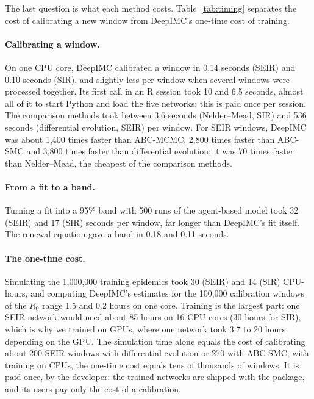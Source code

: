 \documentclass[12pt]{article}
\begin{document}
The last question is what each method costs. Table~\ref{tab:timing} separates the cost of calibrating a
new window from DeepIMC's one-time cost of training.

\paragraph{Calibrating a window.} On one CPU core, DeepIMC calibrated a window in 0.14 seconds (SEIR) and
0.10 seconds (SIR), and slightly less per window when several windows were processed together. Its first
call in an R session took 10 and 6.5 seconds, almost all of it to start Python and load the five
networks; this is paid once per session. The comparison methods took between 3.6 seconds (Nelder--Mead,
SIR) and 536 seconds (differential evolution, SEIR) per window. For SEIR windows, DeepIMC was about 1,400
times faster than ABC-MCMC, 2,800 times faster than ABC-SMC and 3,800 times faster than differential
evolution; it was 70 times faster than Nelder--Mead, the cheapest of the comparison methods.

\paragraph{From a fit to a band.} Turning a fit into a 95\% band with 500 runs of the agent-based model
took 32 (SEIR) and 17 (SIR) seconds per window, far longer than DeepIMC's fit itself. The renewal equation
gave a band in 0.18 and 0.11 seconds.

\paragraph{The one-time cost.} Simulating the 1,000,000 training epidemics took 30 (SEIR) and 14 (SIR)
CPU-hours, and computing DeepIMC's estimates for the 100,000 calibration windows of the $R_0$ range 1.5 and
0.2 hours on one core. Training is the largest part: one SEIR network would need about 85 hours on 16 CPU
cores (30 hours for SIR), which is why we trained on GPUs, where one network took 3.7 to 20 hours depending
on the GPU. The simulation time alone equals the cost of calibrating about 200 SEIR windows with
differential evolution or 270 with ABC-SMC; with training on CPUs, the one-time cost equals tens of
thousands of windows. It is paid once, by the developer: the trained networks are shipped with the
package, and its users pay only the cost of a calibration.

\begin{table}[htbp]
\centering
\caption{Computing time on CPUs (one core per method, the same computer for all methods), and the
one-time cost of DeepIMC.}
\label{tab:timing}
\small

\end{table}
\end{document}
